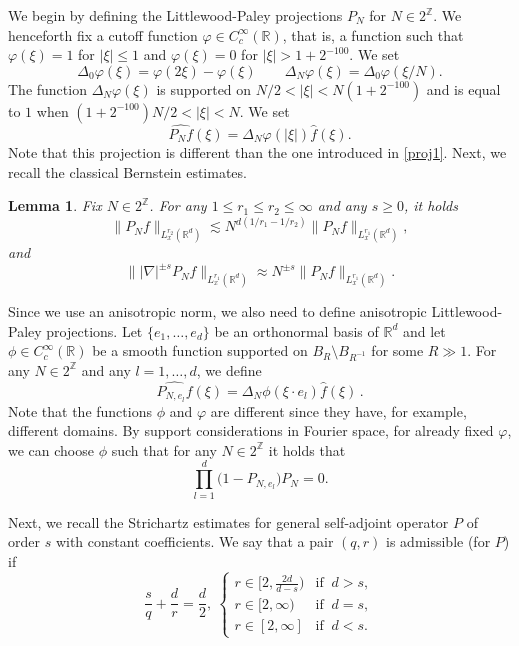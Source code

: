 \documentclass[10pt,leqno]{amsart}
\newtheorem{lem}[thm]{Lemma} %
\newcommand{\R}{\mathbb{R}} %
\numberwithin{equation}{section}
\newcommand{\Z}{\mathbb{Z}}
\begin{document}
We begin by defining the Littlewood-Paley projections $P_N$ for $N\in 2^{\Z}$. We henceforth fix a cutoff function $\varphi \in C_{c}^{\infty} (\R)$, that is, 
a function such that $\varphi (\xi)=1$ for $|\xi|\leq 1$ and $\varphi (\xi)=0$ for $|\xi|>1+2^{-100}$. We set
\begin{equation}\label{dyadic-anulus-bump}
\Delta_{0}\varphi(\xi)=\varphi(2\xi)-\varphi(\xi)\qquad\Delta_{N}\varphi(\xi)=\Delta_{0}\varphi(\xi/N) .
\end{equation}
The function \(\Delta_{N}\varphi(\xi)\) is supported on \(N/2<|\xi|<N(1+2^{-100})\) and is equal to \(1\) when \((1+2^{-100})N/2<|\xi|<N\). We set
\begin{equation}\label{LPproj}
\widehat{P_N f} (\xi)= \Delta_{N}\varphi(|\xi|)\hat{f} (\xi).
\end{equation} 
Note that this projection is different than the one introduced in \eqref{proj1}. Next, we recall the classical Bernstein estimates.

\begin{lem}
\label{bern}
Fix $N\in 2^{\Z}$. For any $1\leq r_1 \leq r_2 \leq \infty$ and any $s\geq 0$, it holds
$$\|P_N f\|_{L_x^{r_2} (\R^d)}\lesssim N^{d(1/r_1 - 1/r_2)} \|P_N f\|_{L_x^{r_1}(\R^d)},$$
and
$$\||\nabla|^{\pm s} P_N f \|_{L_x^{r_1} (\R^d)} \approx N^{\pm s} \|P_N f\|_{L_x^{r_1} (\R^d)}.$$
\end{lem}
Since we use an anisotropic norm, we also need to define anisotropic Littlewood-Paley projections. Let $\{e_1 ,\ldots, e_d\}$ be an orthonormal basis of $\R^d$
and let $\phi \in C^\infty_c(\R)$ be a smooth function supported on \(B_{R}\setminus B_{R^{-1}}\) for some \(R\gg 1\). For any $N\in 2^{\Z}$ and any $l=1,\ldots ,d$, we define
\begin{equation} \label{LP-anisotropic}
\widehat{P_{N,e_l} f} (\xi) = \Delta_{N}\phi(\xi\cdot e_l)\hat{f} (\xi) \,.
\end{equation}
Note that the functions $\phi$ and $\varphi$ are different since they have, for example, different domains.
 By support considerations in Fourier space, for already fixed $\varphi$, we can choose $\phi$ such that for any \( N \in 2^{\Z}\) it holds that
\begin{equation}
\label{e1}
\prod_{l=1}^{d} \Big( 1-  P_{N,e_l}\Big) P_{N} =0.
\end{equation}


Next, we recall the Strichartz estimates for general self-adjoint operator $P$ of order $s$ with constant coefficients. We say that a pair $(q,r)$ is admissible (for $P$) if
\begin{equation}
\label{defadmissible}
\frac{s}{q} +\frac{d}{r}=\frac{d}{2},\ 
\begin{cases}r\in [2, \frac{2d}{d-s}) & \textrm{if } \ d> s, \\  
r\in [2,\infty ) & \textrm{if } \ d=s,\\ 
r\in [2,\infty] &  \textrm{if } \ d <  s. 
\end{cases}
\end{equation}
\end{document}
